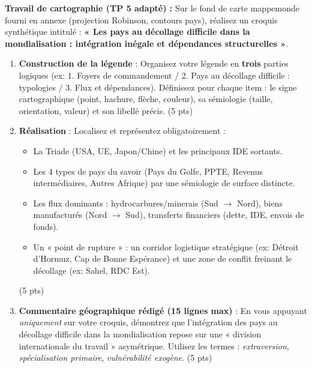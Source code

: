 \documentclass[11pt]{article}
\begin{document}
\begin{exercice}
\noindent \textbf{Travail de cartographie (TP 5 adapté) :} Sur le fond de carte mappemonde fourni en annexe (projection Robinson, contours pays), réalisez un croquis synthétique intitulé : \textbf{« Les pays au décollage difficile dans la mondialisation : intégration inégale et dépendances structurelles »}.

\begin{enumerate}
    \item \textbf{Construction de la légende} : Organisez votre légende en \textbf{trois} parties logiques (ex: 1. Foyers de commandement / 2. Pays au décollage difficile : typologies / 3. Flux et dépendances). Définissez pour chaque item : le signe cartographique (point, hachure, flèche, couleur), sa sémiologie (taille, orientation, valeur) et son libellé précis. (5 pts)
    \item \textbf{Réalisation} : Localisez et représentez obligatoirement :
    \begin{itemize}
        \item La Triade (USA, UE, Japon/Chine) et les principaux IDE sortants.
        \item Les 4 types de pays du savoir (Pays du Golfe, PPTE, Revenus intermédiaires, Autres Afrique) par une sémiologie de surface distincte.
        \item Les flux dominants : hydrocarbures/minerais (Sud $\rightarrow$ Nord), biens manufacturés (Nord $\rightarrow$ Sud), transferts financiers (dette, IDE, envois de fonds).
        \item Un « point de rupture » : un corridor logistique stratégique (ex: Détroit d'Hormuz, Cap de Bonne Espérance) et une zone de conflit freinant le décollage (ex: Sahel, RDC Est).
    \end{itemize}
    (5 pts)
    \item \textbf{Commentaire géographique rédigé (15 lignes max)} : En vous appuyant \textit{uniquement} sur votre croquis, démontrez que l'intégration des pays au décollage difficile dans la mondialisation repose sur une « division internationale du travail » asymétrique. Utilisez les termes : \textit{extraversion}, \textit{spécialisation primaire}, \textit{vulnérabilité exogène}. (5 pts)
\end{enumerate}
\end{exercice}
\end{document}

